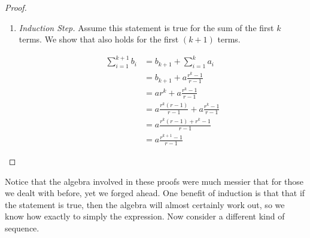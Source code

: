 \begin{proof}
\begin{enumerate}
		\item \emph{Induction Step.} Assume this statement is true for the sum of the first $k$ terms. We show that also holds for the first $(k + 1)$ terms.
		
		\begin{align*}
			\sum_{i = 1}^{k + 1} b_i &=  b_{k + 1} + \sum_{i = 1}^k a_i \\
			&= b_{k + 1} + a \frac{r^k - 1}{r - 1} \\
			&= ar^k +  a \frac{r^k - 1}{r - 1} \\
			&= a \frac{r^k(r - 1)}{r - 1} + a \frac{r^k - 1}{r - 1} \\
			&= a \frac{r^k(r - 1) + r^k - 1}{r - 1} \\
			&= a \frac{r^{k + 1} - 1}{r - 1}
		\end{align*}
	\end{enumerate}	
\end{proof}
\vspace{\baselineskip}

Notice that the algebra involved in these proofs were much messier that for those we dealt with before, yet we forged ahead. One benefit of induction is that that if the statement is true, then the algebra will almost certainly work out, so we know how exactly to simply the expression. Now consider a different kind of sequence.

